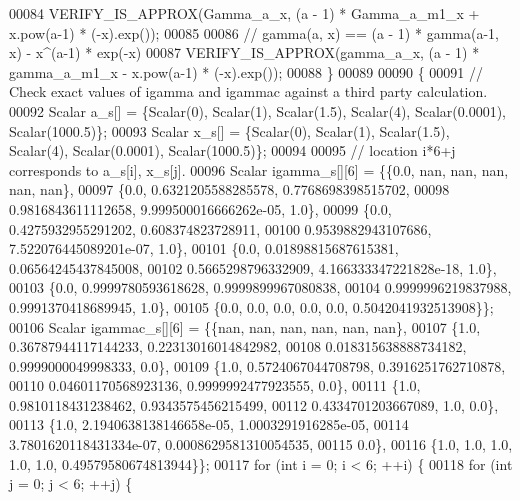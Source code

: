 \begin{DoxyCode}
00084       VERIFY\_IS\_APPROX(Gamma\_a\_x, (a - 1) * Gamma\_a\_m1\_x + x.pow(a-1) * (-x).exp());
00085 
00086       \textcolor{comment}{// gamma(a, x) == (a - 1) * gamma(a-1, x) - x^(a-1) * exp(-x)}
00087       VERIFY\_IS\_APPROX(gamma\_a\_x, (a - 1) * gamma\_a\_m1\_x - x.pow(a-1) * (-x).exp());
00088     \}
00089 
00090     \{
00091       \textcolor{comment}{// Check exact values of igamma and igammac against a third party calculation.}
00092       Scalar a\_s[] = \{Scalar(0), Scalar(1), Scalar(1.5), Scalar(4), Scalar(0.0001), Scalar(1000.5)\};
00093       Scalar x\_s[] = \{Scalar(0), Scalar(1), Scalar(1.5), Scalar(4), Scalar(0.0001), Scalar(1000.5)\};
00094 
00095       \textcolor{comment}{// location i*6+j corresponds to a\_s[i], x\_s[j].}
00096       Scalar igamma\_s[][6] = \{\{0.0, nan, nan, nan, nan, nan\},
00097                               \{0.0, 0.6321205588285578, 0.7768698398515702,
00098                               0.9816843611112658, 9.999500016666262e-05, 1.0\},
00099                               \{0.0, 0.4275932955291202, 0.608374823728911,
00100                               0.9539882943107686, 7.522076445089201e-07, 1.0\},
00101                               \{0.0, 0.01898815687615381, 0.06564245437845008,
00102                               0.5665298796332909, 4.166333347221828e-18, 1.0\},
00103                               \{0.0, 0.9999780593618628, 0.9999899967080838,
00104                               0.9999996219837988, 0.9991370418689945, 1.0\},
00105                               \{0.0, 0.0, 0.0, 0.0, 0.0, 0.5042041932513908\}\};
00106       Scalar igammac\_s[][6] = \{\{nan, nan, nan, nan, nan, nan\},
00107                               \{1.0, 0.36787944117144233, 0.22313016014842982,
00108                                 0.018315638888734182, 0.9999000049998333, 0.0\},
00109                               \{1.0, 0.5724067044708798, 0.3916251762710878,
00110                                 0.04601170568923136, 0.9999992477923555, 0.0\},
00111                               \{1.0, 0.9810118431238462, 0.9343575456215499,
00112                                 0.4334701203667089, 1.0, 0.0\},
00113                               \{1.0, 2.1940638138146658e-05, 1.0003291916285e-05,
00114                                 3.7801620118431334e-07, 0.0008629581310054535,
00115                                 0.0\},
00116                               \{1.0, 1.0, 1.0, 1.0, 1.0, 0.49579580674813944\}\};
00117       \textcolor{keywordflow}{for} (\textcolor{keywordtype}{int} i = 0; i < 6; ++i) \{
00118         \textcolor{keywordflow}{for} (\textcolor{keywordtype}{int} j = 0; j < 6; ++j) \{

\end{DoxyCode}
